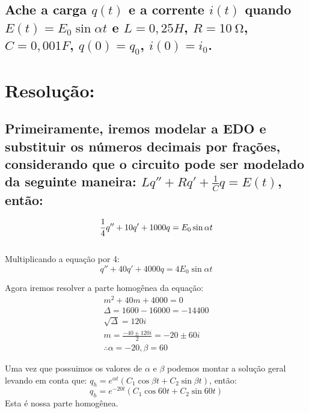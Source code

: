 \documentclass{abntex2}
\begin{document}
\subsection*{\Large Ache a carga $q(t)$ e a corrente $i(t)$ quando $E(t) = E_0\sin{{\alpha}t}$ e $L = 0,25H$, $R = \SI{10}{\ohm}$, $C = 0,001F$, $q(0) = q_0$, $i(0) = i_0$.}

\vspace{1.5cm}
\section*{\textbf{Resolução:}}
\subsection*{\Large Primeiramente, iremos modelar a EDO e substituir os números decimais por frações, \\considerando que o circuito pode ser modelado da seguinte maneira: $Lq'' + Rq' + \frac{1}{C}q = E(t)$, então:}
\begin{equation*}
    \frac{1}{4}q'' + 10q' + 1000q = E_0\sin{{\alpha}t}\\
\end{equation*}
\\
\Large Multiplicando a equação por 4:\\
\begin{equation*}
    q'' + 40q' + 4000q = 4E_0\sin{{\alpha}t}
\end{equation*}

\newpage
\Large Agora iremos resolver a parte homogênea da equação:\\
\begin{eqnarray*}
    m^2 + 40m + 4000 = 0\\
    \Delta = 1600 - 16000 = -14400\\
    \sqrt{\Delta} = 120i\\
    m = \frac{-40\pm120i}{2} = -20\pm60i\\
    \therefore \alpha = -20, \beta = 60
\end{eqnarray*}

\Large Uma vez que possuimos os valores de $\alpha$ e $\beta$ podemos montar a solução geral levando em conta que: $q_h = e^{{\alpha}t} (C_1 \cos{\beta t} + C_2 \sin{\beta t})$, então:\\
\begin{equation*}
    q_h = e^{-20t} (C_1 \cos{60t} + C_2 \sin{60t})
\end{equation*}
\Large Esta é nossa parte homogênea.
\vspace{0.5cm}
\end{document}
